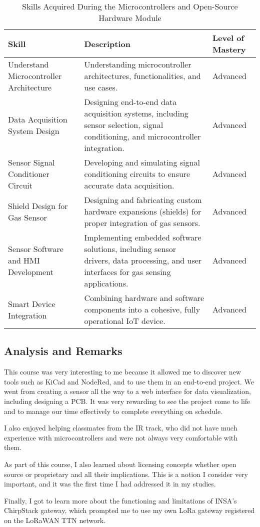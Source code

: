 \begin{table}[H]
    \centering
    \begin{tabular}{|p{3.5cm}|p{8cm}|p{3.5cm}|}
    \hline
    \textbf{Skill} & \textbf{Description} & \textbf{Level of Mastery} \\
    \hline
    Understand Microcontroller Architecture & 
    Understanding microcontroller architectures, functionalities, and use cases. & 
    Advanced \\
    \hline
    Data Acquisition System Design & 
    Designing end-to-end data acquisition systems, including sensor selection, signal conditioning, and microcontroller integration. & 
    Advanced \\
    \hline
    Sensor Signal Conditioner Circuit & 
    Developing and simulating signal conditioning circuits to ensure accurate data acquisition. & 
    Advanced \\
    \hline
    Shield Design for Gas Sensor & 
    Designing and fabricating custom hardware expansions (shields) for proper integration of gas sensors. & 
    Advanced \\
    \hline
    Sensor Software and HMI Development & 
    Implementing embedded software solutions, including sensor drivers, data processing, and user interfaces for gas sensing applications. & 
    Advanced \\
    \hline
    Smart Device Integration & 
    Combining hardware and software components into a cohesive, fully operational IoT device. & 
    Advanced \\
    \hline
    \end{tabular}
    \caption{Skills Acquired During the Microcontrollers and Open-Source Hardware Module}
\end{table}

\subsection{Analysis and Remarks}

\indent \indent This course was very interesting to me because it allowed me to discover new tools such as KiCad and NodeRed, and to use them in an end-to-end project. We went from creating a sensor all the way to a web interface for data visualization, including designing a PCB. It was very rewarding to see the project come to life and to manage our time effectively to complete everything on schedule.

I also enjoyed helping classmates from the IR track, who did not have much experience with microcontrollers and were not always very comfortable with them.

As part of this course, I also learned about licensing concepts whether open source or proprietary and all their implications. This is a notion I consider very important, and it was the first time I had addressed it in my studies.

Finally, I got to learn more about the functioning and limitations of INSA's ChirpStack gateway, which prompted me to use my own LoRa gateway registered on the LoRaWAN TTN network.

